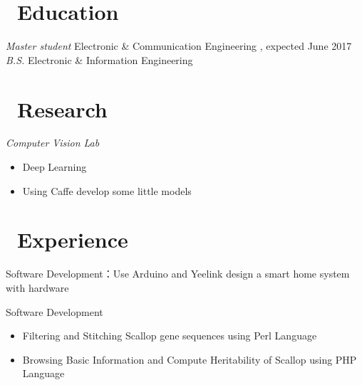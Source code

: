 \documentclass{resume}
\begin{document}


 
\section{\faGraduationCap\ Education}
\textit{Master student} Electronic \& Communication Engineering , expected June 2017
\textit{B.S.} Electronic  \&  Information Engineering

\section{\faBook \ Research}
\textit{Computer Vision Lab}  
\begin{itemize}
  \item Deep Learning
  \item Using Caffe develop some little models
\end{itemize}

\section{\faUsers\ Experience}
Software Development：Use Arduino and Yeelink design a smart home system  with hardware

Software Development
\begin{itemize}
  \item Filtering and Stitching Scallop gene sequences using Perl Language
  \item Browsing Basic Information  and Compute Heritability of Scallop using PHP Language
\end{itemize}
\end{document}
